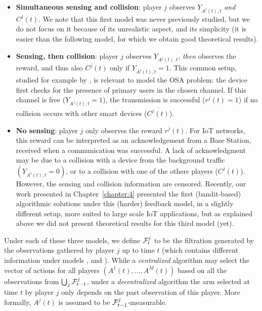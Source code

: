 \begin{itemize}
  \item[\modelun]
    \textbf{Simultaneous sensing and collision}: player $j$ observes  $Y_{A^j(t),t}$ \emph{and} $C^j(t)$.
    We note that this first model was never previously studied, but we do not focus on it because of its unrealistic aspect, and its simplicity (it is easier than the following model, for which we obtain good theoretical results).
  \item[\modeldeux]
    \textbf{Sensing, then collision}: player $j$ observes $Y_{A^j(t),t}$, \emph{then} observes the reward, and thus also $C^j(t)$ only if $Y_{A^j(t),t} = 1$.
    This common setup, studied for example by \cite{Anandkumar11,Avner15,Rosenski16}, is relevant to model the OSA problem: the device first checks for the presence of primary users in the chosen channel.
    If this channel is free ($Y_{A^j(t),t}=1$), the transmission is successful ($r^j(t)=1$) if no collision occurs with other smart devices ($\overline{C^j(t)}$).
  \item[\modeltrois]
    \textbf{No sensing}: player $j$ only observes the reward $r^j(t)$.
    For IoT networks, this reward can be interpreted as an acknowledgement from a Base Station,
    received when a communication was successful.
    A lack of acknowledgment may be due to a collision
    with a device from the background traffic $(Y_{A^j(t),t}=0)$,
    or to a collision with one of the others players ($C^j(t)$).
    However, the sensing and collision information are censored.
    Recently, our work presented in Chapter~\ref{chapter:4} \cite{Bonnefoi17} presented the first (bandit-based) algorithmic solutions under this (harder) feedback model, in a slightly different setup, more suited to large scale IoT applications, but as explained above we did not present theoretical results for this third model (yet).
\end{itemize}

Under each of these three models, we define $\mathcal{F}^j_t$ to be the filtration generated by the observations gathered by player $j$ up to time $t$ (which contains different information under models \modelun, \modeldeux{} and \modeltrois).
While a \emph{centralized} algorithm may select the vector of actions for all players $(A^1(t),\dots,A^M(t))$ based on all the observations from $\bigcup_j \mathcal{F}^j_{t-1}$, under a \emph{decentralized} algorithm the arm selected at time $t$ by player $j$ only depends on the past observation of this player.
More formally, $A^j(t)$ is assumed to be $\mathcal{F}^j_{t-1}$-measurable.

